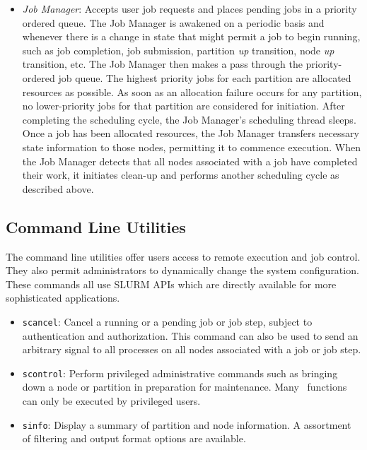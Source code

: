 \documentclass[10pt,onecolumn,times]{../common/llncs}
\begin{document}
{\begin{itemize}
\item {\em Job Manager}: Accepts user job requests and places pending jobs
in a priority ordered queue.  The Job Manager is awakened on a periodic
basis and whenever there is a change in state that might permit a job to
begin running, such as job completion, job submission, partition {\em up}
transition, node {\em up} transition, etc.  The Job Manager then makes
a pass through the priority-ordered job queue. The highest priority
jobs for each partition are allocated resources as possible. As soon as
an allocation failure occurs for any partition, no lower-priority jobs
for that partition are considered for initiation.  After completing the
scheduling cycle, the Job Manager's scheduling thread sleeps.  Once a
job has been allocated resources, the Job Manager transfers necessary
state information to those nodes, permitting it to commence execution.
When the Job Manager detects that all nodes associated with a job
have completed their work, it initiates clean-up and performs another
scheduling cycle as described above.

\end{itemize}

\subsection{Command Line Utilities}

The command line utilities offer users access to remote execution and job control. 
They also
permit administrators to dynamically change the system configuration.
These commands all use SLURM APIs which are directly available for more
sophisticated applications.

\begin{itemize}
\item {\tt scancel}: Cancel a running or a pending job or job step,
subject to authentication and authorization. This command can also be
used to send an arbitrary signal to all processes on all nodes associated
with a job or job step.

\item {\tt scontrol}: Perform privileged administrative commands
such as bringing down a node or partition in preparation for maintenance.
Many \scontrol\ functions can only be executed by privileged users.

\item {\tt sinfo}: Display a summary of partition and node information.
A assortment of filtering and output format options are available.


\end{itemize}}
\end{document}

